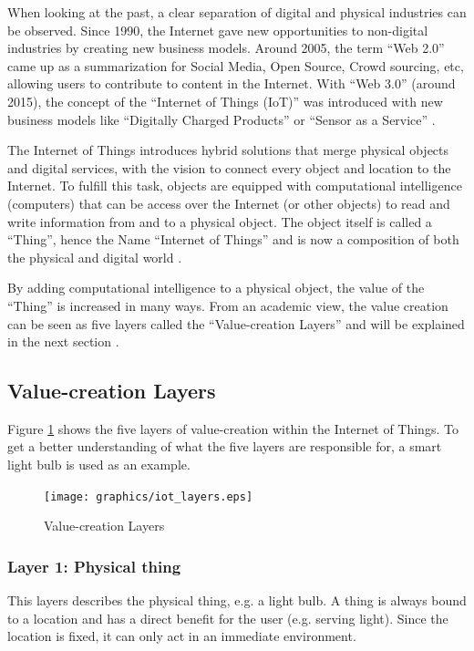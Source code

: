 When looking at the past, a clear separation of digital and physical industries can be observed. Since 1990, the Internet gave new opportunities to non-digital industries by creating new business models. Around 2005, the term ``Web 2.0'' came up as a summarization for Social Media, Open Source, Crowd sourcing, etc, allowing users to contribute to content in the Internet. With ``Web 3.0'' (around 2015), the concept of the ``Internet of Things (IoT)'' was introduced with new business models like ``Digitally Charged Products'' or ``Sensor as a Service'' \cite{iotfleisch}.

The Internet of Things introduces hybrid solutions that merge physical objects and digital services, with the vision to connect every object and location to the Internet. To fulfill this task, objects are equipped with computational intelligence (computers) that can be access over the Internet (or other objects) to read and write information from and to a physical object. The object itself is called a ``Thing'', hence the Name ``Internet of Things'' and is now a composition of both the physical and digital world \cite{iotfleisch}.

By adding computational intelligence to a physical object, the value of the ``Thing'' is increased in many ways. From an academic view, the value creation can be seen as five layers called the ``Value-creation Layers'' and will be explained in the next section \cite{iotfleisch}.

\subsection{Value-creation Layers}

Figure \ref{fig:value_creation_layers} shows the five layers of value-creation within the Internet of Things. To get a better understanding of what the five layers are responsible for, a smart light bulb is used as an example.

\begin{figure}[h]
	\centering
		\texttt{[image: graphics/iot\_layers.eps]}
	\caption{Value-creation Layers\cite{iotfleisch}}
	\label{fig:value_creation_layers}
\end{figure}

\subsubsection{Layer 1: Physical thing}
This layers describes the physical thing, e.g. a light bulb. A thing is always bound to a location and has a direct benefit for the user (e.g. serving light). Since the location is fixed, it can only act in an immediate environment.

